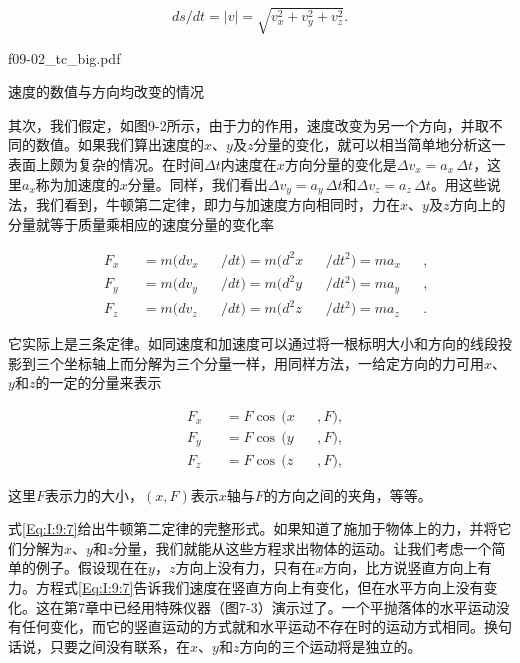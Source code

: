 \documentclass[12pt,oneside]{book}
\providecommand{\abs}[1]{\lvert#1\rvert}
\begin{document}
\begin{equation}
\label{Eq:I:9:6}
ds/dt=\abs{v}=\sqrt{v_x^2+v_y^2+v_z^2}.
\end{equation}

\begin{fig}{f09-02_tc_big.pdf}
\caption{速度的数值与方向均改变的情况}
\label{fig:速度的数值与方向均改变的情况}
\end{fig}

其次，我们假定，如图9-2所示，由于力的作用，速度改变为另一个方向，并取不同的数值。如果我们算出速度的$ x $、$ y $及$ z $分量的变化，就可以相当简单地分析这一表面上颇为复杂的情况。在时间$ \Delta t $内速度在$ x $方向分量的变化是$ \Delta v_x=a_x\,\Delta t $，这里$ a_x $称为加速度的$ x $分量。同样，我们看出$ \Delta v_y=a_y\,\Delta t $和$ \Delta v_z=a_z\,\Delta t $。用这些说法，我们看到，牛顿第二定律，即力与加速度方向相同时，力在$ x $、$ y $及$ z $方向上的分量就等于质量乘相应的速度分量的变化率

\begin{equation}
\begin{alignedat}{5}
&F_x&&=m(dv_x&&/dt)=m(d^2x&&/dt^2)=ma_x&&,\\
&F_y&&=m(dv_y&&/dt)=m(d^2y&&/dt^2)=ma_y&&,\\
&F_z&&=m(dv_z&&/dt)=m(d^2z&&/dt^2)=ma_z&&.
\end{alignedat}
\label{Eq:I:9:7}
\end{equation}


它实际上是三条定律。如同速度和加速度可以通过将一根标明大小和方向的线段投影到三个坐标轴上而分解为三个分量一样，用同样方法，一给定方向的力可用$ x $、$ y $和$ z $的一定的分量来表示


\begin{equation}
\begin{alignedat}{3}
&F_x&&=F\cos\,(x&&,F),\\
&F_y&&=F\cos\,(y&&,F),\\
&F_z&&=F\cos\,(z&&,F),
\end{alignedat}
\label{Eq:I:9:8}
\end{equation}

这里$ F $表示力的大小，$ (x,F) $表示$ x $轴与$ F $的方向之间的夹角，等等。

式\eqref{Eq:I:9:7}给出牛顿第二定律的完整形式。如果知道了施加于物体上的力，并将它们分解为$ x $、$ y $和$ z $分量，我们就能从这些方程求出物体的运动。让我们考虑一个简单的例子。假设现在在$ y $，$ z $方向上没有力，只有在$ x $方向，比方说竖直方向上有力。方程式\eqref{Eq:I:9:7}告诉我们速度在竖直方向上有变化，但在水平方向上没有变化。这在第7章中已经用特殊仪器（图7-3）演示过了。一个平抛落体的水平运动没有任何变化，而它的竖直运动的方式就和水平运动不存在时的运动方式相同。换句话说，只要之间没有联系，在$ x $、$ y $和$ z $方向的三个运动将是独立的。
\end{document}
